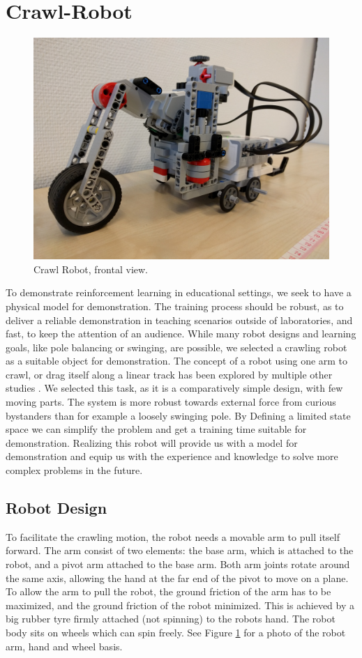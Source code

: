 \documentclass[11pt, a4paper]{article}
\begin{document}
\section{Crawl-Robot}
\begin{figure}[H]
	\centering
	\includegraphics[width=0.6\linewidth]{images/crawl_robot}
	\caption{Crawl Robot, frontal view.}
	\label{fig:crawl_robot}
\end{figure}
To demonstrate reinforcement learning in educational settings, we seek to have a physical model for demonstration. The training process should be robust, as to deliver a reliable demonstration in teaching scenarios outside of laboratories, and fast, to keep the attention of an audience. While many robot designs and learning goals, like pole balancing or swinging, are possible, we selected a crawling robot as a suitable object for demonstration. The concept of a robot using one arm to crawl, or drag itself along a linear track has been explored by multiple other studies \cite{youtube_crawl2} \cite{youtube_crawl}. We selected this task, as it is a comparatively simple design, with few moving parts. The system is more robust towards external force from curious bystanders than for example a loosely swinging pole. By Defining a limited state space we can simplify the problem and get a training time suitable for demonstration. Realizing this robot will provide us with a model for demonstration  and equip us with the experience and knowledge to solve more complex problems in the future.


\subsection{Robot Design}
To facilitate the crawling motion, the robot needs a movable arm to pull itself forward. The arm consist of two elements: the base arm, which is attached to the robot, and a pivot arm attached to the base arm. Both arm joints rotate around the same axis, allowing the hand at the far end of the pivot to move on a plane. To allow the arm to pull the robot, the ground friction of the arm has to be maximized, and the ground friction of the robot minimized. This is achieved by a big rubber tyre firmly attached (not spinning) to the robots hand. The robot body sits on wheels which can spin freely. See Figure \ref{fig:crawl_robot} for a photo of the robot arm, hand and wheel basis.
\end{document}
